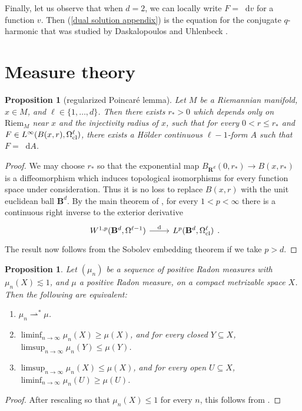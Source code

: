 \documentclass[reqno,11pt]{amsart}
\newcommand{\RR}{\mathbf{R}}
\newcommand{\Ball}{\mathbf{B}}
\newcommand*\dif{\mathop{}\!\mathrm{d}}
\newcommand{\weakto}{\rightharpoonup}
\newcommand{\Riem}{\mathrm{Riem}}
\newtheorem{proposition}[theorem]{Proposition}
\theoremstyle{definition}
\numberwithin{equation}{section}
\begin{document}
Finally, let us observe that when $d = 2$, we can locally write $F = \dif v$ for a function $v$.
Then (\ref{dual solution appendix}) is the equation for the conjugate $q$-harmonic that was studied by Daskalopoulos and Uhlenbeck \cite[\S3]{daskalopoulos2020transverse}.


\appendix
\section{Measure theory}\label{GMT appendix}
\begin{proposition}[regularized Poincar\'e lemma]\label{Hodge theorem}
Let $M$ be a Riemannian manifold, $x \in M$, and $\ell \in \{1, \dots, d\}$.
Then there exists $r_* > 0$ which depends only on $\Riem_M$ near $x$ and the injectivity radius of $x$, such that for every $0 < r \leq r_*$ and $F \in L^\infty(B(x, r), \Omega^\ell_{\rm cl})$, there exists a H\"older continuous $\ell - 1$-form $A$ such that $F = \dif A$.
\end{proposition}
\begin{proof}
We may choose $r_*$ so that the exponential map $B_{\RR^d}(0, r_*) \to B(x, r_*)$ is a diffeomorphism which induces topological isomorphisms for every function space under consideration.
Thus it is no loss to replace $B(x, r)$ with the unit euclidean ball $\Ball^d$.
By the main theorem of \cite{Costabel2010}, for every $1 < p < \infty$ there is a continuous right inverse to the exterior derivative
\[\begin{tikzcd}
	{W^{1, p}(\Ball^d, \Omega^{\ell - 1})} & {L^p(\Ball^d, \Omega^\ell_{\rm cl})}
	\arrow["{\mathrm d}", from=1-1, to=1-2]
\end{tikzcd}.\]
The result now follows from the Sobolev embedding theorem if we take $p > d$.
\end{proof}

\begin{proposition}\label{portmanteau}
Let $(\mu_n)$ be a sequence of positive Radon measures with $\mu_n(X) \lesssim 1$, and $\mu$ a positive Radon measure, on a compact metrizable space $X$.
Then the following are equivalent:
\begin{enumerate}
\item $\mu_n \weakto^* \mu$.
\item $\liminf_{n \to \infty} \mu_n(X) \geq \mu(X)$, and for every closed $Y \subseteq X$, $\limsup_{n \to \infty} \mu_n(Y) \leq \mu(Y)$.
\item $\limsup_{n \to \infty} \mu_n(X) \leq \mu(X)$, and for every open $U \subseteq X$, $\liminf_{n \to \infty} \mu_n(U) \geq \mu(U)$.
\end{enumerate}
\end{proposition}
\begin{proof}
After rescaling so that $\mu_n(X) \leq 1$ for every $n$, this follows from \cite[Theorem 13.16]{klenke2013probability}.
\end{proof}
\end{document}
